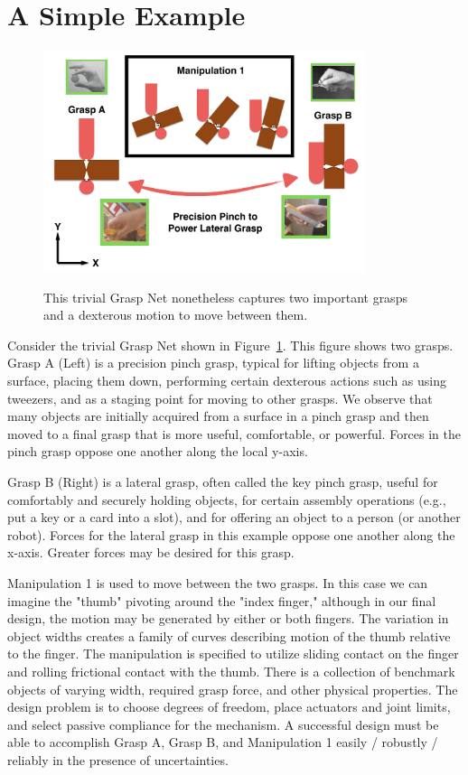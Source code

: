 \section{A Simple Example}


\begin{figure}
\begin{center}
{\includegraphics[width=3.7in]{./figs/simpleExample.png}}
\end{center}
\vspace*{-0.3in}
\caption[]{\small This trivial Grasp Net nonetheless captures two important grasps and a dexterous motion to move between them.}
\label{SimpleGraspNet}
\end{figure}

Consider the trivial Grasp Net shown in Figure~\ref{SimpleGraspNet}.     This figure shows two grasps.   Grasp A (Left) is a precision pinch grasp, typical for lifting objects from a surface, placing them down, performing certain dexterous actions such as using tweezers, and as a staging point for moving to other grasps.   We observe that many objects are initially acquired from a surface in a pinch grasp and then moved to a final grasp that is more useful, comfortable, or powerful.    Forces in the pinch grasp oppose one another along the local y-axis.   

Grasp B (Right) is a lateral grasp, often called the key pinch grasp, useful for comfortably and securely holding objects, for certain assembly operations (e.g., put a key or a card into a slot), and for offering an object to a person (or another robot).   Forces for the lateral grasp in this example oppose one another along the x-axis.  Greater forces may be desired for this grasp.   

Manipulation 1 is used to move between the two grasps.   In this case we can imagine the "thumb" pivoting around the "index finger," although in our final design, the motion may be generated by either or both fingers.    The variation in object widths creates a family of curves describing motion of the thumb relative to the finger.   The manipulation is specified to utilize sliding contact on the finger and rolling frictional contact with the thumb.  There is a collection of benchmark objects of varying width, required grasp force, and other physical properties.   The design problem is to choose degrees of freedom, place actuators and joint limits, and select passive compliance for the mechanism.  A successful design must be able to accomplish Grasp A, Grasp B, and Manipulation 1 easily / robustly / reliably in the presence of uncertainties.

